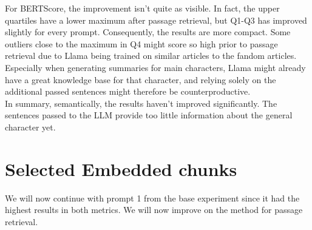 For BERTScore, the improvement isn't quite as visible. In fact, the upper quartiles have a lower maximum after passage retrieval, but Q1-Q3 has improved slightly for every prompt. Consequently, the results are more compact. Some outliers close to the maximum in Q4 might score so high prior to passage retrieval due to Llama being trained on similar articles to the fandom articles. Especially when generating summaries for main characters, Llama might already have a great knowledge base for that character, and relying solely on the additional passed sentences might therefore be counterproductive.\\

In summary, semantically, the results haven't improved significantly. The sentences passed to the LLM provide too little information about the general character yet.



\newpage
\section{Selected Embedded chunks}

We will now continue with prompt 1 from the base experiment since it had the highest results in both metrics. We will now improve on the method for passage retrieval.